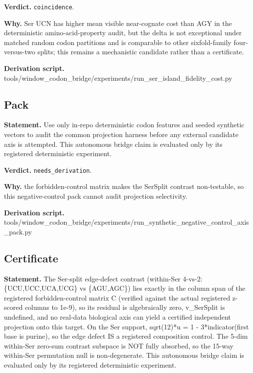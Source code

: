 \textbf{Verdict.} \texttt{coincidence}.

\textbf{Why.} Ser UCN has higher mean visible near-cognate cost than AGY in the deterministic amino-acid-property
audit, but the delta is not exceptional under matched random codon partitions and is comparable to
other sixfold-family four-versus-two splits; this remains a mechanistic candidate rather than a
certificate.

\textbf{Derivation script.} tools/window\_codon\_bridge/experiments/run\_ser\_island\_fidelity\_cost.py

\subsection{Pack}\label{sec:bridge-pack}
\textbf{Statement.} Use only in-repo deterministic codon features and seeded synthetic vectors to audit the common
projection harness before any external candidate axis is attempted. This autonomous bridge claim is
evaluated only by its registered deterministic experiment.

\textbf{Verdict.} \texttt{needs\_derivation}.

\textbf{Why.} the forbidden-control matrix makes the SerSplit contrast non-testable, so this negative-control pack
cannot audit projection selectivity.

\textbf{Derivation script.} tools/window\_codon\_bridge/experiments/run\_synthetic\_negative\_control\_axis\_pack.py

\subsection{Certificate}\label{sec:bridge-certificate}
\textbf{Statement.} The Ser-split edge-defect contrast (within-Ser 4-vs-2: \{UCU,UCC,UCA,UCG\} vs \{AGU,AGC\}) lies
exactly in the column span of the registered forbidden-control matrix C (verified against the actual
registered z-scored columns to 1e-9), so its residual is algebraically zero, v\_SerSplit is
undefined, and no real-data biological axis can yield a certified independent projection onto this
target. On the Ser support, sqrt(12)*u = 1 - 3*indicator(first base is purine), so the edge defect
IS a registered composition control. The 5-dim within-Ser zero-sum contrast subspace is NOT fully
absorbed, so the 15-way within-Ser permutation null is non-degenerate. This autonomous bridge claim
is evaluated only by its registered deterministic experiment.

